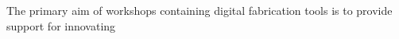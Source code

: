 The primary aim of workshops containing digital fabrication tools is to provide support for innovating 